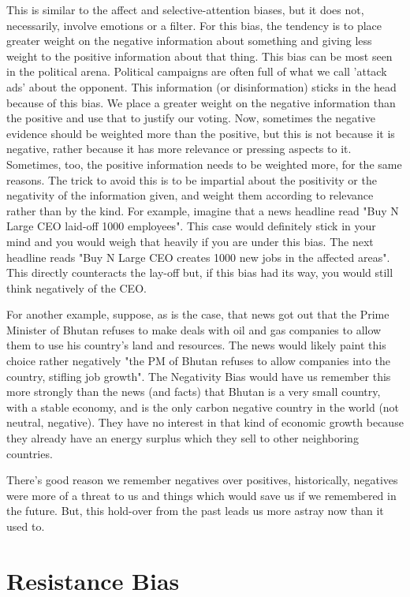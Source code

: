 This is similar to the affect and selective-attention biases, but it does not, necessarily, involve emotions or a filter. For this bias, the tendency is to place greater weight on the negative information about something and giving less weight to the positive information about that thing. This bias can be most seen in the political arena. Political campaigns are often full of what we call 'attack ads' about the opponent. This information (or disinformation) sticks in the head because of this bias. We place a greater weight on the negative information than the positive and use that to justify our voting. Now, sometimes the negative evidence should be weighted more than the positive, but this is not because it is negative, rather because it has more relevance or pressing aspects to it. Sometimes, too, the positive information needs to be weighted more, for the same reasons. The trick to avoid this is to be impartial about the positivity or the negativity of the information given, and weight them according to relevance rather than by the kind. For example, imagine that a news headline read "Buy N Large CEO laid-off 1000 employees". This case would definitely stick in your mind and you would weigh that heavily if you are under this bias. The next headline reads "Buy N Large CEO creates 1000 new jobs in the affected areas". This directly counteracts the lay-off but, if this bias had its way, you would still think negatively of the CEO.

For another example, suppose, as is the case, that news got out that the Prime Minister of Bhutan refuses to make deals with oil and gas companies to allow them to use his country's land and resources. The news would likely paint this choice rather negatively "the PM of Bhutan refuses to allow companies into the country, stifling job growth".  The Negativity Bias would have us remember this more strongly than the news  (and facts) that Bhutan is a very small country, with a stable economy, and is the only carbon negative country in the world (not neutral, negative). They have no interest in that kind of economic growth because they already have an energy surplus which they sell to other neighboring countries. 

There's good reason we remember negatives over positives, historically, negatives were more of a threat to us and things which would save us if we remembered in the future. But, this hold-over from the past leads us more astray now than it used to.
\section{Resistance Bias}


